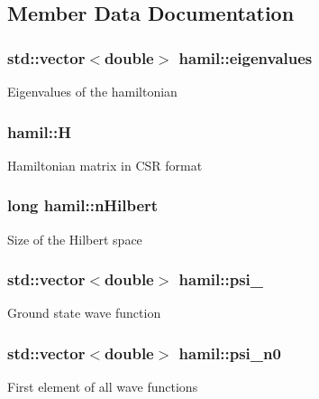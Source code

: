 \subsection{Member Data Documentation}
\subsubsection[{\texorpdfstring{eigenvalues}{eigenvalues}}]{\setlength{\rightskip}{0pt plus 5cm}std\+::vector$<$double$>$ hamil\+::eigenvalues}\hypertarget{classhamil_a22699c0dd6f460537289842e445d878e}{}\label{classhamil_a22699c0dd6f460537289842e445d878e}
Eigenvalues of the hamiltonian 
\subsubsection[{\texorpdfstring{H}{H}}]{ hamil\+::H}\hypertarget{classhamil_aa440fff2dff9ec215fe5d50976deceae}{}\label{classhamil_aa440fff2dff9ec215fe5d50976deceae}
Hamiltonian matrix in C\+SR format 
\subsubsection[{\texorpdfstring{n\+Hilbert}{nHilbert}}]{\setlength{\rightskip}{0pt plus 5cm}long hamil\+::n\+Hilbert}\hypertarget{classhamil_a8f3ba91f36a6ef7cef1c2248668a9ba4}{}\label{classhamil_a8f3ba91f36a6ef7cef1c2248668a9ba4}
Size of the Hilbert space 
\subsubsection[{\texorpdfstring{psi\+\_\+0}{psi_0}}]{\setlength{\rightskip}{0pt plus 5cm}std\+::vector$<$double$>$ hamil\+::psi\+\_}\hypertarget{classhamil_a7626c19b1aebcf74f47a6ea77825d464}{}\label{classhamil_a7626c19b1aebcf74f47a6ea77825d464}
Ground state wave function 
\subsubsection[{\texorpdfstring{psi\+\_\+n0}{psi_n0}}]{\setlength{\rightskip}{0pt plus 5cm}std\+::vector$<$double$>$ hamil\+::psi\+\_\+n0}\hypertarget{classhamil_ab301c39efac3bcbd0fa5df20be44643c}{}\label{classhamil_ab301c39efac3bcbd0fa5df20be44643c}
First element of all wave functions 
